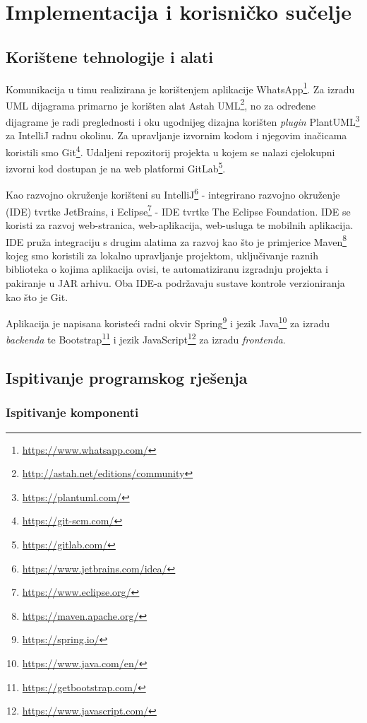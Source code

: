 \chapter{Implementacija i korisničko sučelje}
		
		
		\section{Korištene tehnologije i alati}
			
		Komunikacija u timu realizirana je korištenjem aplikacije WhatsApp\footnote{\url{https://www.whatsapp.com/}}. Za izradu UML dijagrama primarno je korišten alat Astah UML\footnote{\url{http://astah.net/editions/community}}, no za određene dijagrame je radi preglednosti i oku ugodnijeg dizajna korišten \textit{plugin} PlantUML\footnote{\url{https://plantuml.com/}} za IntelliJ radnu okolinu. Za upravljanje izvornim kodom i njegovim inačicama koristili smo Git\footnote{\url{https://git-scm.com/}}. Udaljeni repozitorij projekta u kojem se nalazi cjelokupni izvorni kod dostupan je na web platformi GitLab\footnote{\url{https://gitlab.com/}}.
			
				Kao razvojno okruženje korišteni su IntelliJ\footnote{\url{https://www.jetbrains.com/idea/}} - integrirano razvojno okruženje (IDE) tvrtke JetBrains, i Eclipse\footnote{\url{https://www.eclipse.org/}} - IDE tvrtke The Eclipse Foundation. IDE se koristi za razvoj web-stranica, web-aplikacija, web-usluga te mobilnih aplikacija. IDE pruža integraciju s drugim alatima za razvoj kao što je primjerice Maven\footnote{\url{https://maven.apache.org/}} kojeg smo koristili za lokalno upravljanje projektom, uključivanje raznih biblioteka o kojima aplikacija ovisi, te automatiziranu izgradnju projekta i pakiranje u JAR arhivu. Oba IDE-a podržavaju sustave kontrole verzioniranja kao što je Git.
				
				Aplikacija je napisana koristeći radni okvir Spring\footnote{\url{https://spring.io/}} i jezik Java\footnote{\url{https://www.java.com/en/}} za izradu \textit{backenda} te Bootstrap\footnote{\url{https://getbootstrap.com/}} i jezik JavaScript\footnote{\url{https://www.javascript.com/}} za izradu \textit{frontenda}.
 			
			\eject 
		
	
		\section{Ispitivanje programskog rješenja}
			
			\subsection{Ispitivanje komponenti}
		
